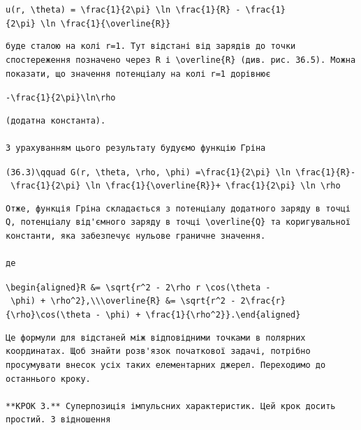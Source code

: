 \documentclass[
  ukrainian,
]{article}
\begin{document}
\texttt{u(r,\ \textbackslash{}theta)\ =\ \textbackslash{}frac\{1\}\{2\textbackslash{}pi\}\ \textbackslash{}ln\ \textbackslash{}frac\{1\}\{R\}\ -\ \textbackslash{}frac\{1\}\{2\textbackslash{}pi\}\ \textbackslash{}ln\ \textbackslash{}frac\{1\}\{\textbackslash{}overline\{R\}\}}

\begin{verbatim}
буде сталою на колі r=1. Тут відстані від зарядів до точки спостереження позначено через R і \overline{R} (див. рис. 36.5). Можна показати, що значення потенціалу на колі r=1 дорівнює
\end{verbatim}

\texttt{-\textbackslash{}frac\{1\}\{2\textbackslash{}pi\}\textbackslash{}ln\textbackslash{}rho}

\begin{verbatim}
(додатна константа).

З урахуванням цього результату будуємо функцію Гріна
\end{verbatim}

\texttt{(36.3)\textbackslash{}qquad\ G(r,\ \textbackslash{}theta,\ \textbackslash{}rho,\ \textbackslash{}phi)\ =\textbackslash{}frac\{1\}\{2\textbackslash{}pi\}\ \textbackslash{}ln\ \textbackslash{}frac\{1\}\{R\}-\ \textbackslash{}frac\{1\}\{2\textbackslash{}pi\}\ \textbackslash{}ln\ \textbackslash{}frac\{1\}\{\textbackslash{}overline\{R\}\}+\ \textbackslash{}frac\{1\}\{2\textbackslash{}pi\}\ \textbackslash{}ln\ \textbackslash{}rho}

\begin{verbatim}
Отже, функція Гріна складається з потенціалу додатного заряду в точці Q, потенціалу від'ємного заряду в точці \overline{Q} та коригувальної константи, яка забезпечує нульове граничне значення.

де
\end{verbatim}

\texttt{\textbackslash{}begin\{aligned\}R\ \&=\ \textbackslash{}sqrt\{r\^{}2\ -\ 2\textbackslash{}rho\ r\ \textbackslash{}cos(\textbackslash{}theta\ -\ \textbackslash{}phi)\ +\ \textbackslash{}rho\^{}2\},\textbackslash{}\textbackslash{}\textbackslash{}overline\{R\}\ \&=\ \textbackslash{}sqrt\{r\^{}2\ -\ 2\textbackslash{}frac\{r\}\{\textbackslash{}rho\}\textbackslash{}cos(\textbackslash{}theta\ -\ \textbackslash{}phi)\ +\ \textbackslash{}frac\{1\}\{\textbackslash{}rho\^{}2\}\}.\textbackslash{}end\{aligned\}}

\begin{verbatim}
Це формули для відстаней між відповідними точками в полярних координатах. Щоб знайти розв'язок початкової задачі, потрібно просумувати внесок усіх таких елементарних джерел. Переходимо до останнього кроку.

**КРОК 3.** Суперпозиція імпульсних характеристик. Цей крок досить простий. З відношення
\end{verbatim}
\end{document}
